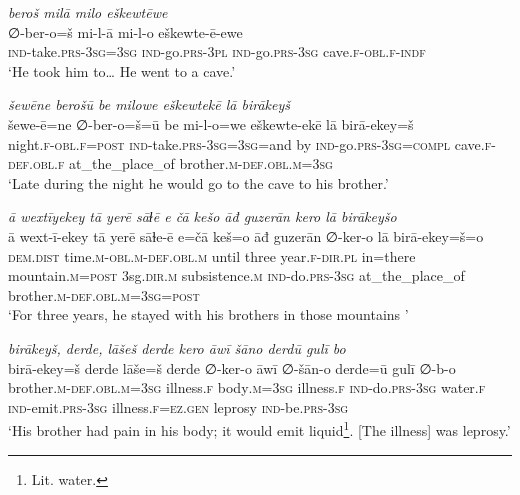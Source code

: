 \ea \label{DG.17}
\textit{beroš milā milo eškewtēwe} \\ 
\gll ∅-ber-o=š mi-l-ā mi-l-o eškewte-ē-ewe \\ 
 \textsc{ind-}take\textsc{.prs}\textsc{-3sg}\textsc{=3sg} \textsc{ind-}go\textsc{.prs}\textsc{-3pl} \textsc{ind-}go\textsc{.prs}\textsc{-3sg} cave\textsc{\textsc{.f}}\textsc{-obl}\textsc{\textsc{.f}}\textsc{-indf} \\ 
\glt `He took him to… He went to a cave.'
\z 
 
\ea \label{DG.19}
\textit{šewēne berošū be milowe eškewtekē lā birākeyš} \\ 
\gll šewe-ē=ne ∅-ber-o=š=ū be mi-l-o=we eškewte-ekē lā birā-ekey=š \\ 
 night\textsc{\textsc{.f}}\textsc{-obl}\textsc{\textsc{.f}}\textsc{=\textsc{post}} \textsc{ind-}take\textsc{.prs}\textsc{-3sg}\textsc{=3sg}=and by \textsc{ind-}go\textsc{.prs}\textsc{-3sg}\textsc{=\textsc{compl}} cave\textsc{\textsc{.f}}\textsc{-def}\textsc{.obl}\textsc{\textsc{.f}} at\_the\_place\_of brother\textsc{.m}\textsc{-def}\textsc{.obl}\textsc{.m}\textsc{=3sg} \\ 
\glt `Late during the night he would go to the cave to his brother.'
\z 
 
\ea \label{DG.21}
\textit{ā wextīyekey tā yerē sāɫē e čā kešo āđ guzerān kero lā birākeyšo} \\ 
\gll ā wext-ī-ekey tā yerē sāɫe-ē e=čā keš=o āđ guzerān ∅-ker-o lā birā-ekey=š=o \\ 
 \textsc{dem.dist} time\textsc{.m}\textsc{-obl}\textsc{.m}\textsc{-def}\textsc{.obl}\textsc{.m} until three year\textsc{\textsc{.f}}\textsc{-dir}\textsc{.pl} in=there mountain\textsc{.m}\textsc{=\textsc{post}} 3sg\textsc{.dir}\textsc{.m} subsistence\textsc{.m} \textsc{ind-}do\textsc{.prs}\textsc{-3sg} at\_the\_place\_of brother\textsc{.m}\textsc{-def}\textsc{.obl}\textsc{.m}\textsc{=3sg}\textsc{=\textsc{post}} \\ 
\glt `For three years, he stayed with his brothers in those mountains '
\z 
 
\ea \label{DG.22}
\textit{birākeyš, derde, lāšeš derde kero āwī šāno derdū gulī bo} \\ 
\gll birā-ekey=š derde lāše=š derde ∅-ker-o āwī ∅-šān-o derde=ū gulī ∅-b-o \\ 
 brother\textsc{.m}\textsc{-def}\textsc{.obl}\textsc{.m}\textsc{=3sg} illness\textsc{\textsc{.f}} body\textsc{.m}\textsc{=3sg} illness\textsc{\textsc{.f}} \textsc{ind-}do\textsc{.prs}\textsc{-3sg} water\textsc{\textsc{.f}} \textsc{ind-}emit\textsc{.prs}\textsc{-3sg} illness\textsc{\textsc{.f}}\textsc{=ez}\textsc{.gen} leprosy \textsc{ind-}be\textsc{.prs}\textsc{-3sg} \\ 
\glt `His brother had pain in his body; it would emit liquid\footnote{Lit. water.}. [The illness] was leprosy.'
\z 
 
